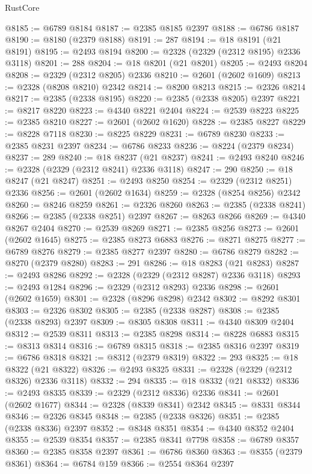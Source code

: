 \begin{lexlean}{RustCore}
\begin{coremodule}
@8185 := @6789 @8184
@8187 := @2385 @8185 @2397
@8188 := @6786 @8187
@8190 := @8180 (@2379 @8188)
@8191 := 287
@8194 := @18 @8191 (@21 @8191)
@8195 := @2493 @8194
@8200 := @2328 (@2329 (@2312 @8195) @2336 @3118)
@8201 := 288
@8204 := @18 @8201 (@21 @8201)
@8205 := @2493 @8204
@8208 := @2329 (@2312 @8205) @2336
@8210 := @2601 (@2602 @1609)
@8213 := @2328 (@8208 @8210) @2342
@8214 := @8200 @8213
@8215 := @2326 @8214
@8217 := @2385 (@2338 @8195)
@8220 := @2385 (@2338 @8205) @2397
@8221 := @8217 @8220
@8223 := @4340 @8221 @2404
@8224 := @2539 @8223
@8225 := @2385 @8210
@8227 := @2601 (@2602 @1620)
@8228 := @2385 @8227
@8229 := @8228 @7118
@8230 := @8225 @8229
@8231 := @6789 @8230
@8233 := @2385 @8231 @2397
@8234 := @6786 @8233
@8236 := @8224 (@2379 @8234)
@8237 := 289
@8240 := @18 @8237 (@21 @8237)
@8241 := @2493 @8240
@8246 := @2328 (@2329 (@2312 @8241) @2336 @3118)
@8247 := 290
@8250 := @18 @8247 (@21 @8247)
@8251 := @2493 @8250
@8254 := @2329 (@2312 @8251) @2336
@8256 := @2601 (@2602 @1634)
@8259 := @2328 (@8254 @8256) @2342
@8260 := @8246 @8259
@8261 := @2326 @8260
@8263 := @2385 (@2338 @8241)
@8266 := @2385 (@2338 @8251) @2397
@8267 := @8263 @8266
@8269 := @4340 @8267 @2404
@8270 := @2539 @8269
@8271 := @2385 @8256
@8273 := @2601 (@2602 @1645)
@8275 := @2385 @8273 @6883
@8276 := @8271 @8275
@8277 := @6789 @8276
@8279 := @2385 @8277 @2397
@8280 := @6786 @8279
@8282 := @8270 (@2379 @8280)
@8283 := 291
@8286 := @18 @8283 (@21 @8283)
@8287 := @2493 @8286
@8292 := @2328 (@2329 (@2312 @8287) @2336 @3118)
@8293 := @2493 @1284
@8296 := @2329 (@2312 @8293) @2336
@8298 := @2601 (@2602 @1659)
@8301 := @2328 (@8296 @8298) @2342
@8302 := @8292 @8301
@8303 := @2326 @8302
@8305 := @2385 (@2338 @8287)
@8308 := @2385 (@2338 @8293) @2397
@8309 := @8305 @8308
@8311 := @4340 @8309 @2404
@8312 := @2539 @8311
@8313 := @2385 @8298
@8314 := @8228 @6883
@8315 := @8313 @8314
@8316 := @6789 @8315
@8318 := @2385 @8316 @2397
@8319 := @6786 @8318
@8321 := @8312 (@2379 @8319)
@8322 := 293
@8325 := @18 @8322 (@21 @8322)
@8326 := @2493 @8325
@8331 := @2328 (@2329 (@2312 @8326) @2336 @3118)
@8332 := 294
@8335 := @18 @8332 (@21 @8332)
@8336 := @2493 @8335
@8339 := @2329 (@2312 @8336) @2336
@8341 := @2601 (@2602 @1677)
@8344 := @2328 (@8339 @8341) @2342
@8345 := @8331 @8344
@8346 := @2326 @8345
@8348 := @2385 (@2338 @8326)
@8351 := @2385 (@2338 @8336) @2397
@8352 := @8348 @8351
@8354 := @4340 @8352 @2404
@8355 := @2539 @8354
@8357 := @2385 @8341 @7798
@8358 := @6789 @8357
@8360 := @2385 @8358 @2397
@8361 := @6786 @8360
@8363 := @8355 (@2379 @8361)
@8364 := @6784 @159
@8366 := @2554 @8364 @2397

\end{coremodule}
\end{lexlean}

